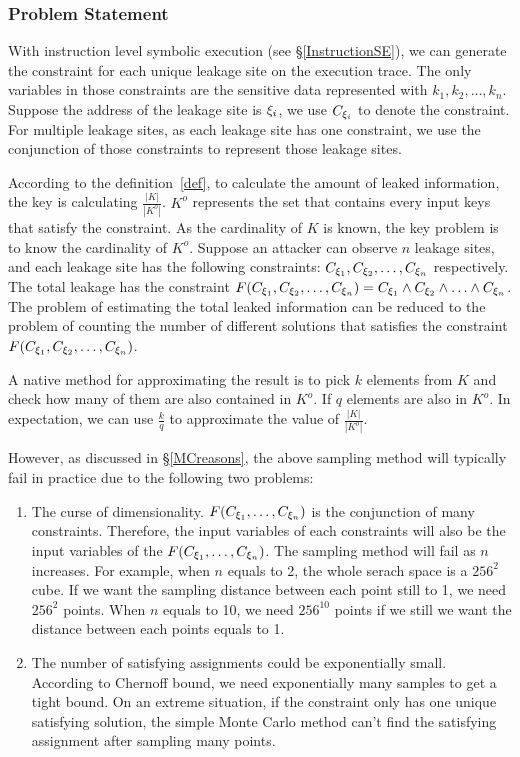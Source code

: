 \subsubsection{Problem Statement}
With instruction level symbolic execution (see \S\ref{InstructionSE}), we can generate the constraint 
for each unique leakage site on the execution trace.
The only variables in those constraints are the sensitive data represented
with $k_1, k_2, \ldots , k_n$. Suppose the address of the leakage site is ${\xi}_{i}$,
we use $C_{{\xi}_{i}}$ to denote the constraint. For multiple leakage sites, 
as each leakage site has one constraint, we 
use the conjunction of those constraints to represent those leakage sites. 

According to the definition~\ref{def}, to calculate the amount of leaked 
information, the key is calculating $\frac{|K|}{|K^o|}$. $K^o$ represents
the set that contains every input keys that satisfy the constraint. As the 
cardinality of $K$ is known, the key problem is to know the cardinality of
$K^o$. Suppose an attacker can observe $n$ leakage sites, and each leakage site has
the following constraints: $C_{{\xi}_{1}}, C_{{\xi}_{2}}, \ldots, C_{{\xi}_{n}}$ respectively. 
The total leakage has the constraint 
$F(C_{{\xi}_{1}},C_{{\xi}_{2}},\ldots,C_{{\xi}_{n}}) = C_{{\xi}_{1}} \land C_{{\xi}_{2}} 
\land \ldots \land C_{{\xi}_{n}}$. The problem of estimating the total leaked information 
can be reduced to the problem of counting the number of different solutions 
that satisfies the constraint $F(C_{{\xi}_{1}},C_{{\xi}_{2}},\ldots,C_{{\xi}_{n}})$. 

A native method for approximating 
the result is to pick $k$ elements from $K$ and check how many of them are also
contained in $K^o$. If $q$ elements are also in $K^o$. In expectation, we can
use $\frac{k}{q}$ to approximate the value of $\frac{|K|}{|K^o|}$.

However, as discussed in \S\ref{MCreasons},
the above sampling method will typically fail in practice due to the following two problems:

\begin{enumerate}
      \item The curse of dimensionality. $F(C_{{\xi}_{1}},\ldots,C_{{\xi}_{n}})$ is the conjunction of many
      constraints. Therefore, the input variables of each constraints will also be 
      the input variables of the  $F(C_{{\xi}_{1}},\ldots,C_{{\xi}_{n}})$. The sampling method will fail as 
      $n$ increases. For example, when $n$ equals to 2, the whole serach space is 
      a $256^2$ cube. If we want the sampling distance between each point still to 1,
      we need $256^2$ points. When $n$ equals to 10, we need $256^{10}$ points if we 
      still we want the distance between each points equals to 1. 

      \item The number of satisfying assignments could be exponentially small.
      According to Chernoff bound, we need exponentially many samples to get 
      a tight bound. On an extreme situation, if the constraint only has one unique
      satisfying solution, the simple Monte Carlo method can't find the satisfying
      assignment after sampling many points.
\end{enumerate}

